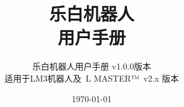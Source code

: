 \documentclass[UTF8, hyperref]{ctexrep}
\newcommand{\LM}{~{\sf L MASTER™}~}
\begin{document}
\pagestyle{empty}

\title{乐白机器人\\
用户手册
}
\author{乐白机器人用户手册 v1.0.0版本\\
适用于LM3机器人及\LM v2.x 版本
}
\date{\today}
\maketitle %
\tableofcontents
\pagestyle{fancy}

\appendix
\listoftables %
\listoffigures %
\printindex %
\end{document}
